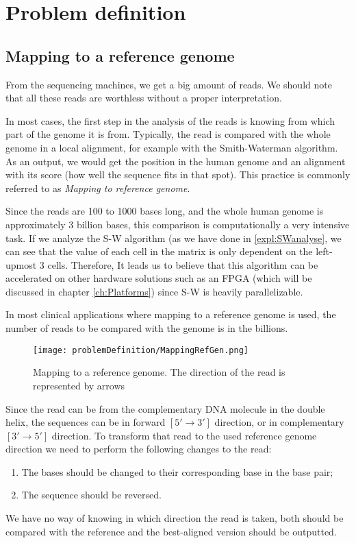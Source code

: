 \section{Problem definition}

\subsection{Mapping to a reference genome}

From the sequencing machines, we get a big amount of reads. We should note that all these reads are worthless without a proper interpretation.

In most cases, the first step in the analysis of the reads is knowing from which part of the genome it is from. Typically, the read is compared with the whole genome in a local alignment, for example with the Smith-Waterman algorithm. As an output, we would get the position in the human genome and an alignment with its score (how well the sequence fits in that spot). This practice is commonly referred to as \emph{Mapping to reference genome}.

Since the reads are 100 to 1000 bases long, and the whole human genome is approximately 3 billion bases, this comparison is computationally a very intensive task. If we analyze the S-W algorithm (as we have done in \ref{expl:SWanalyse}, we can see that the value of each cell in the matrix is only dependent on the left-upmost 3 cells. Therefore, It leads us to believe that this algorithm can be accelerated on other hardware solutions such as an FPGA (which will be discussed in chapter \ref{ch:Platforms}) since S-W is heavily parallelizable.

In most clinical applications where mapping to a reference genome is used, the number of reads to be compared with the genome is in the billions.

\begin{figure}[H]
	\centering
	\texttt{[image: problemDefinition/MappingRefGen.png]}
	\caption{Mapping to a reference genome. The direction of the read is represented by arrows}
	\label{fig:mapRefGen}
\end{figure}

Since the read can be from the complementary DNA molecule in the double helix, the sequences can be in forward $[5' \rightarrow 3']$ direction, or in complementary $[3' \rightarrow 5']$ direction. To transform that read to the used reference genome direction we need to perform the following changes to the read:
\begin{enumerate}
	\item The bases should be changed to their corresponding base in the base pair;
	\item The sequence should be reversed.
\end{enumerate}
We have no way of knowing in which direction the read is taken, both should be compared with the reference and the best-aligned version should be outputted.

